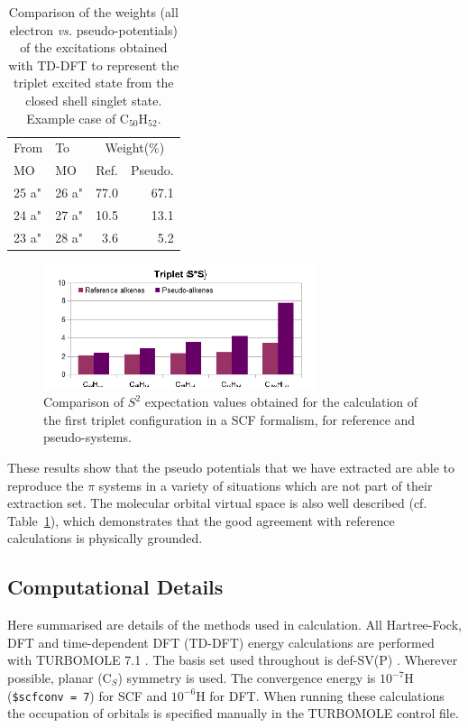 \documentclass[journal=jctcce,manuscript=article]{achemso}
\begin{document}
\begin{table}
\caption{\label{tab:coef}Comparison of the weights (all electron \emph{vs.} pseudo-potentials)
of the excitations obtained with TD-DFT
to represent the triplet excited state from the closed shell singlet state.
Example case of C$_{50}$H$_{52}$.}
\begin{tabular}{|l|l|r|r|}
\hline
From    & To       & \multicolumn{2}{c|}{Weight(\%)}\\
MO      & MO       & Ref. & Pseudo.\\\hline\hline
25 a" & 26 a" & 77.0 &   67.1  \\
24 a" & 27 a" & 10.5 &   13.1  \\
23 a" & 28 a" & 3.6  &    5.2  \\\hline
\end{tabular}
\end{table}

\begin{figure}[h]
\includegraphics[width=8cm]{ssquare}
\caption{Comparison of $S^2$ expectation values obtained for the calculation
of the first triplet configuration in a SCF formalism, for reference
and pseudo-systems.}
\label{fig:ssquare}
\end{figure}

These results show that the pseudo potentials that we have extracted are able to reproduce the
$\pi$ systems in a variety of situations which are not part of their extraction set.
The molecular orbital virtual space is also well described (cf. Table~\ref{tab:coef}),
which demonstrates that the good agreement with reference calculations is
physically grounded.

\subsection{Computational Details}

Here summarised are details of the methods used in calculation. All Hartree-Fock, DFT and time-dependent DFT (TD-DFT) energy calculations are performed with TURBOMOLE 7.1 \cite{TURBOMOLE}. The basis set used throughout is def-SV(P) \cite{defsvp}. Wherever possible, planar (C\(_{S}\)) symmetry is used. The convergence energy is \(10^{-7}\)H (\texttt{\$scfconv = 7}) for SCF and \(10^{-6}\)H for DFT. When running these calculations the occupation of orbitals is specified manually in the TURBOMOLE control file.
\end{document}
